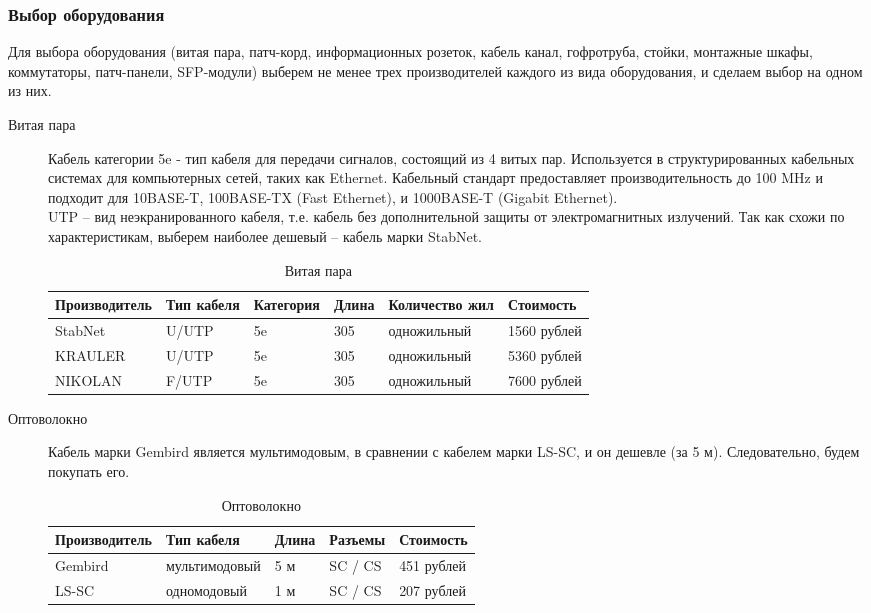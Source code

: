 \subsubsection{Выбор  оборудования}
Для выбора оборудования (витая пара, патч-корд, информационных розеток, кабель канал, гофротруба, стойки, монтажные шкафы, коммутаторы, патч-панели, SFP-модули) выберем не менее трех производителей каждого из вида оборудования, и сделаем выбор на одном из них.

\begin{description}
\item[Витая пара]
  Кабель категории 5e - тип кабеля для передачи сигналов, состоящий из 4 витых пар. Используется в структурированных кабельных системах для компьютерных сетей, таких как Ethernet. Кабельный стандарт предоставляет производительность до 100 MHz и подходит для 10BASE-T, 100BASE-TX (Fast Ethernet), и 1000BASE-T (Gigabit Ethernet).
\\UTP – вид неэкранированного кабеля, т.е. кабель без дополнительной защиты от электромагнитных излучений. 
Так как схожи по характеристикам, выберем наиболее дешевый – кабель марки StabNet.
  \begin{table}[!htp]
    \centering
    \begin{tabular}{|l|l|l|l|l|l|}
      \hline
      Производитель & Тип кабеля & Категория & Длина & Количество жил & Стоимость \\ \hline
     StabNet & U/UTP & 5e & 305 & одножильный & 1560 рублей \\ \hline
      KRAULER & U/UTP & 5e & 305 & одножильный & 5360 рублей \\ \hline
      NIKOLAN & F/UTP & 5e & 305 & одножильный & 7600 рублей \\ \hline
    \end{tabular}
    \caption{Витая пара}
    \label{table:cabel}
  \end{table}
  
\item[Оптоволокно]
  Кабель марки Gembird является мультимодовым, в сравнении с кабелем марки LS-SC, и он дешевле (за 5 м). Следовательно, будем покупать его.
  \begin{table}[!htbp]
  \centering
    \begin{tabular}{|l|l|l|l|l|}%
      \hline
      Производитель & Тип кабеля & Длина & Разъемы & Стоимость \\ \hline
      Gembird & мультимодовый & 5 м & SC / CS & 451 рублей \\ \hline
      LS-SC & одномодовый & 1 м & SC / CS & 207 рублей \\ \hline
    \end{tabular}
    \caption{Оптоволокно}
    \label{table:optics}
  \end{table}
  

\end{description}
